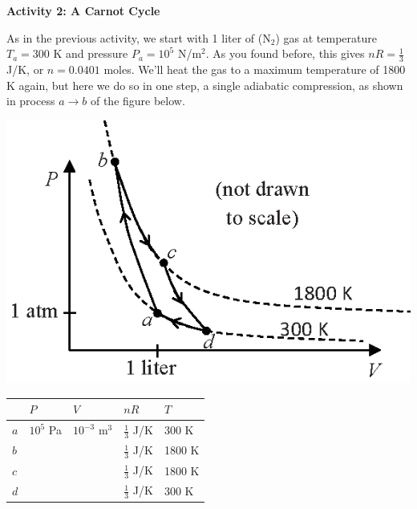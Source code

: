 \vspace{0.3in}

\pagebreak
\textbf{Activity 2: A Carnot Cycle}

As in the previous activity, we start with 1 liter of ($\textrm{N}_2$) gas at temperature $T_a = 300$ K and pressure $P_a = 10^5$ N/m$^2$.   As you found before, this gives $nR=\frac{1}{3}$ J/K, or $n=0.0401$ moles.  We'll heat the gas to a maximum temperature of 1800 K again, but here we do so in one step, a single adiabatic compression, as shown in process $a \rightarrow b$ of the figure below.

\begin{minipage}{0.44\textwidth}
\includegraphics[width=1.0\textwidth]{ideal_gas_cycles/carnot_cycle.eps}
\end{minipage}
\begin{minipage}{0.54\textwidth}
\vspace{0.1 in}
\renewcommand{\arraystretch}{2.0}
\begin{tabular}{| C{0.3in} | C{0.6in} | C{0.6in} | C{0.6in} | C{0.6in} |}
\hline
& $P$ & $V$ & $nR$ & $T$ \\ \hline
$a$ & $10^5$ Pa & $10^{-3}$ m$^3$ & $\frac{1}{3}$ J/K & 300 K \\ \hline
$b$ &                  &                            & $\frac{1}{3}$ J/K & 1800 K \\ \hline
$c$ &                  &                            & $\frac{1}{3}$ J/K & 1800 K \\ \hline
$d$ &                  &                            & $\frac{1}{3}$ J/K & 300 K \\ \hline
\end{tabular}
\renewcommand{\arraystretch}{1.0}
\end{minipage}

